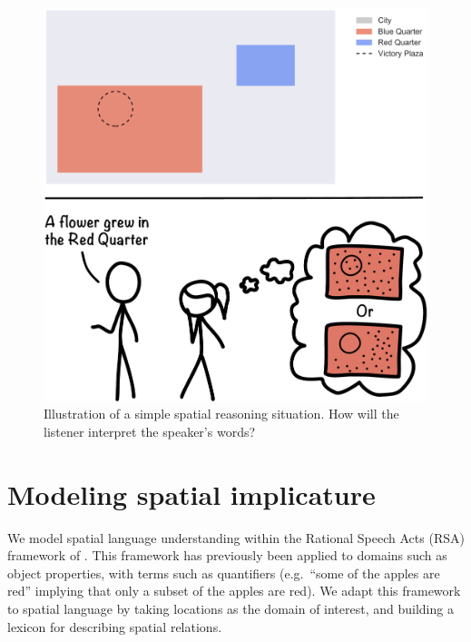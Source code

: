 \documentclass[10pt,letterpaper]{article}
\begin{document}

\begin{figure}[h]
\center
\includegraphics[width=.5\textwidth]{figures/illustration2.pdf}
\caption{Illustration of a simple spatial reasoning situation. How will the listener interpret the speaker's words?}
\label{fig:illustration}
\end{figure}

\vspace{-10pt}
\section{Modeling spatial implicature}\label{mod}

We model spatial language understanding within the Rational Speech Acts (RSA) framework of . This framework has previously been applied to domains such as object properties, with terms such as quantifiers (e.g.~``some of the apples are red'' implying that only a subset of the apples are red). We adapt this framework to spatial language by taking locations as the domain of interest, and building a lexicon for describing spatial relations. 
\end{document}
